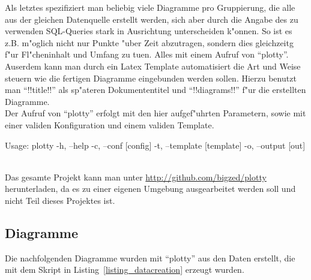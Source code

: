     Als letztes spezifiziert man beliebig viele Diagramme pro Gruppierung,
    die alle aus der gleichen Datenquelle erstellt werden, sich aber durch die
    Angabe des zu verwenden SQL-Queries stark in Ausrichtung unterscheiden
    k"onnen. So ist es z.B. m"oglich nicht nur Punkte "uber Zeit abzutragen,
    sondern dies gleichzeitg f"ur Fl"cheninhalt und Umfang zu tuen. Alles
    mit einem Aufruf von \enquote{plotty}.\\
    Auserdem kann man durch ein Latex Template automatisiert die Art und Weise 
    steuern wie die fertigen Diagramme eingebunden werden sollen. Hierzu benutzt
    man \enquote{!!title!!} als sp"ateren Dokumententitel und 
    \enquote{!!diagrams!!} f"ur die erstellten Diagramme.\\
    Der Aufruf von \enquote{plotty} erfolgt mit den hier aufgef"uhrten
    Parametern, sowie mit einer validen Konfiguration und einem validen 
    Template.\\
    \begin{code}[caption={Plottyparameter},label=listing_plottyparameter]
Usage: plotty
    -h, --help
    -c, --conf [config] 
    -t, --template [template]
    -o, --output [out]
    \end{code}\\
    Das gesamte Projekt kann man unter \url{http://github.com/bigzed/plotty }
    herunterladen, da es zu einer eigenen Umgebung ausgearbeitet werden soll und
    nicht Teil dieses Projektes ist.
  \subsection{Diagramme}
    Die nachfolgenden Diagramme wurden mit \enquote{plotty} aus den Daten
    erstellt, die mit dem Skript in Listing~\ref{listing_datacreation} erzeugt 
    wurden.\\
